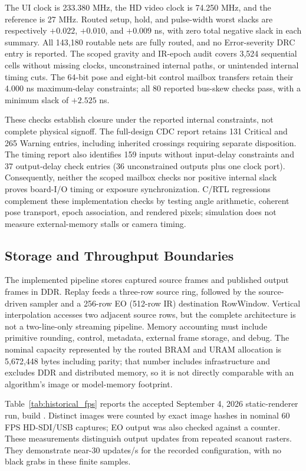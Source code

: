 The UI clock is 233.380 MHz, the HD video clock is 74.250 MHz, and the reference is 27 MHz. Routed setup, hold, and pulse-width worst slacks are respectively $+0.022$, $+0.010$, and $+0.009$ ns, with zero total negative slack in each summary. All 143,180 routable nets are fully routed, and no Error-severity DRC entry is reported. The scoped gravity and IR-epoch audit covers 3,524 sequential cells without missing clocks, unconstrained internal paths, or unintended internal timing cuts. The 64-bit pose and eight-bit control mailbox transfers retain their 4.000 ns maximum-delay constraints; all 80 reported bus-skew checks pass, with a minimum slack of $+2.525$ ns.

These checks establish closure under the reported internal constraints, not complete physical signoff. The full-design CDC report retains 131 Critical and 265 Warning entries, including inherited crossings requiring separate disposition. The timing report also identifies 159 inputs without input-delay constraints and 37 output-delay check entries (36 unconstrained outputs plus one clock port). Consequently, neither the scoped mailbox checks nor positive internal slack proves board-I/O timing or exposure synchronization. C/RTL regressions complement these implementation checks by testing angle arithmetic, coherent pose transport, epoch association, and rendered pixels; simulation does not measure external-memory stalls or camera timing.

\subsection{Storage and Throughput Boundaries}
The implemented pipeline stores captured source frames and published output frames in DDR. Replay feeds a three-row source ring, followed by the source-driven sampler and a 256-row EO (512-row IR) destination RowWindow. Vertical interpolation accesses two adjacent source rows, but the complete architecture is not a two-line-only streaming pipeline. Memory accounting must include primitive rounding, control, metadata, external frame storage, and debug. The nominal capacity represented by the routed BRAM and URAM allocation is 5,672,448 bytes including parity; that number includes infrastructure and excludes DDR and distributed memory, so it is not directly comparable with an algorithm's image or model-memory footprint.

Table~\ref{tab:historical_fps} reports the accepted September 4, 2026 static-renderer run, build . Distinct images were counted by exact image hashes in nominal 60 FPS HD-SDI/USB captures; EO output was also checked against a  counter. These measurements distinguish output updates from repeated scanout rasters. They demonstrate near-30 updates/s for the recorded configuration, with no black grabs in these finite samples.

